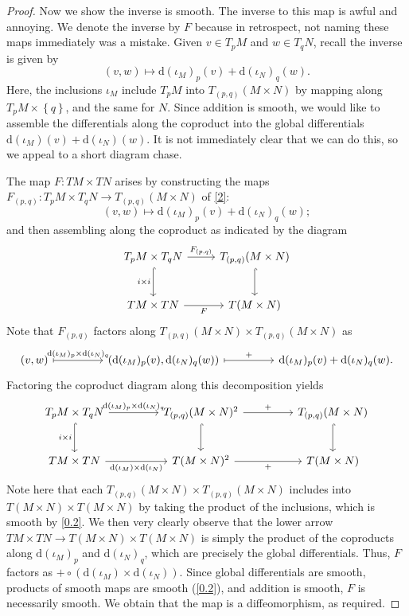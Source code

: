 \documentclass[11pt, letterpaper]{article}
\theoremstyle{plain}
\begin{document}
\begin{proof}
	Now we show the inverse is smooth. The inverse to this map is awful and annoying. We denote the inverse by $F$ because in retrospect, not naming these maps immediately was a mistake. Given $v\in T_pM$ and $w\in T_qN$, recall the inverse is given by
	\[
		(v,w)\mapsto \mathrm{d} (\iota _M)_p(v)+\mathrm{d} (\iota _N)_q(w)
	.\]
	Here, the inclusions $\iota _M$ include $T_pM$ into $T_{(p,q)} (M\times N)$ by mapping along $T_pM\times \left\{ q \right\} $, and the same for $N$. Since addition is smooth, we would like to assemble the differentials along the coproduct into the global differentials $\mathrm{d} (\iota _M)(v)+\mathrm{d} (\iota _N)(w)$. It is not immediately clear that we can do this, so we appeal to a short diagram chase.

	The map $F:TM\times TN$ arises by constructing the maps $F_{(p,q)} :T_pM\times T_qN\to T_{(p,q)} (M\times N)$ of \cref{2}:
	\[
		(v,w)\mapsto \mathrm{d} (\iota _M)_p(v)+\mathrm{d} (\iota _N)_q(w)
	;\]
	and then assembling along the coproduct as indicated by the diagram
	\[\begin{tikzcd}[row sep = 2.5em, column sep = 2.5em]
	T_pM \times T_qN \ar[" F_{(p \text{,} q)}  ", r] \ar[" i\times i "', hook, d]  & T_{(p,q)} (M\times N)\ar[hook, d]  \\
	TM\times TN\ar[" F "', r] & T(M\times N)
	\end{tikzcd}\]
	Note that $F_{(p,q)} $ factors along $T_{(p,q)} (M\times N)\times T_{(p,q)} (M\times N)$ as
	\[\begin{tikzcd}[row sep = 2.5em, column sep = 4.5em]
		(v,w)\ar[" \mathrm{d}(\iota_M)_p\times \mathrm{d} (\iota _N)_q ", mapsto, r]  & (\mathrm{d} (\iota _M)_p(v),\mathrm{d} (\iota _N)_q(w))\ar[" + ", mapsto,r]  & \mathrm{d} (\iota _M)_p(v)+\mathrm{d} (\iota _N)_q(w).
	\end{tikzcd}\]
	Factoring the coproduct diagram along this decomposition yields
	\[\begin{tikzcd}[row sep = 2.5em, column sep = 4.5em]
	T_pM \times T_qN \ar[" \mathrm{d}(\iota _M)_p\times \mathrm{d} (\iota _N)_q ", r] \ar[" i\times i "', hook, d]  & T_{(p,q)} (M\times N)^2 \ar[" + ", r] \ar[hook, d]  & T_{(p,q)} (M\times N)\ar[hook, d]  \\
	TM\times TN\ar[" \mathrm{d} (\iota _M)\times \mathrm{d} (\iota _N) "', r]  & T(M\times N)^2 \ar[" + "', r]  & T(M\times N)
	\end{tikzcd}\]
	Note here that each $T_{(p,q)} (M\times N)\times T_{(p,q)} (M\times N)$ includes into $T(M\times N)\times T(M\times N)$ by taking the product of the inclusions, which is smooth by \cref{0.2}. We then very clearly observe that the lower arrow $TM\times TN\to T(M\times N)\times T(M\times N)$ is simply the product of the coproducts along $\mathrm{d} (\iota _M)_p$ and $\mathrm{d} (\iota _N)_q$, which are precisely the global differentials. Thus, $F$ factors as $+ \circ (\mathrm{d}(\iota _M)\times \mathrm{d} (\iota _N))$. Since global differentials are smooth, products of smooth maps are smooth (\cref{0.2}), and addition is smooth, $F$ is necessarily smooth. We obtain that the map is a diffeomorphism, as required.
\end{proof}
\end{document}
